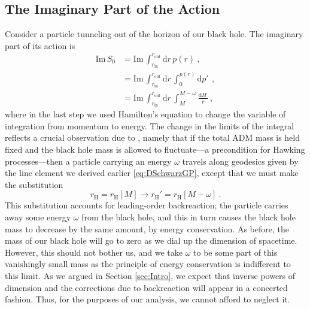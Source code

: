 \documentclass[a4paper,11pt]{article}
\newcommand{\dd}[1]{\text{d}#1 \, }
\newcommand{\im}{\text{Im} \,}
\begin{document}
\subsection{The Imaginary Part of the Action}
Consider a particle tunneling out of the horizon of our black hole. The imaginary part of its action is
\begin{align}
\im S_0 &= \im \int_{r_{\text{in}}}^{r_{\text{out}}} \dd{r} p(r) \ , \\
&= \im \int_{r_{\text{in}}}^{r_{\text{out}}} \dd{r} \int_{0}^{p(r)} \dd{p'} \ , \\
&= \im \int_{r_{\text{in}}}^{r_{\text{out}}} \dd{r} \int_{M}^{M-\omega} \frac{\dd{H}}{\dot{r}} \ ,
\end{align}
where in the last step we used Hamilton's equation to change the variable of integration from momentum to energy. The change in the limits of the integral reflects a crucial observation due to \cite{Kraus:1994by,Kraus:1994fj}, namely that if the total ADM mass is held fixed and the black hole mass is allowed to fluctuate---a precondition for Hawking processes---then a particle carrying an energy $\omega$ travels along geodesics given by the line element we derived earlier \eqref{eq:DSchwarzGP}, except that we must make the substitution 
\begin{equation}
r_{\text{H}} = r_{\text{H}} [M] \longrightarrow r_{\text{H}}' = r_{\text{H}} [M-\omega] \ .
\end{equation}
This substitution accounts for leading-order backreaction; the particle carries away some energy $\omega$ from the black hole, and this in turn causes the black hole mass to decrease by the same amount, by energy conservation. As before, the mass of our black hole will go to zero as we dial up the dimension of spacetime. However, this should not bother us, and we take $\omega$ to be some part of this vanishingly small mass as the principle of energy conservation is indifferent to this limit. As we argued in Section \ref{sec:Intro}, we expect that inverse powers of dimension and the corrections due to backreaction will appear in a concerted fashion. Thus, for the purposes of our analysis, we cannot afford to neglect it.
\end{document}
